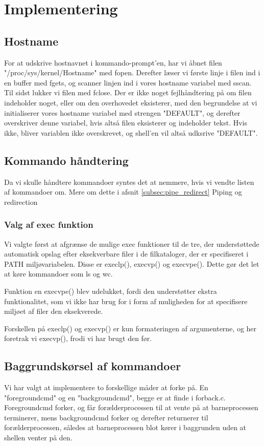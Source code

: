 \section{Implementering}

\subsection{Hostname}
For at udskrive hostnavnet i kommando-prompt'en, har vi åbnet filen "/proc/sys/kernel/Hostname" med fopen. Derefter læser vi første linje i filen ind i en buffer med fgets, og scanner linjen ind i vores hostname variabel med sscan. Til sidst lukker vi filen med fclose. Der er ikke noget fejlhåndtering på om filen indeholder noget, eller om den overhovedet eksisterer, med den begrundelse at vi initialiserer vores hostname variabel med strengen "DEFAULT", og derefter overskriver denne variabel, hvis altså filen eksisterer og indeholder tekst. Hvis ikke, bliver variablen ikke overskrevet, og shell'en vil altså udksrive "DEFAULT".

\subsection{Kommando håndtering}
Da vi skulle håndtere kommandoer syntes det at nemmere, hvis vi vendte listen af kommandoer om. Mere om dette i afsnit \ref{subsec:pipe_redirect} Piping og redirection

\subsubsection{Valg af exec funktion}
Vi valgte først at afgrænse de mulige exec funktioner til de tre, der understøttede automatisk opslag efter eksekverbare filer i de filkataloger, der er specifiseret i PATH miljøvariabelen. Disse er execlp(), execvp() og execvpe(). Dette gør det let at køre kommandoer som ls og wc.

Funktion en execvpe() blev udelukket, fordi den understøtter ekstra funktionalitet, som vi ikke har brug for i form af muligheden for at specifisere miljøet af filer den eksekverede.

Forskellen på execlp() og execvp() er kun formateringen af argumenterne, og her foretrak vi execvp(), frodi vi har brugt den før.

\subsection{Baggrundskørsel af kommandoer}
Vi har valgt at implementere to forskellige måder at forke på. En "foregroundcmd" og en "backgroundcmd", begge er at finde i forback.c. Foregroundcmd forker, og får forælderprocessen til at vente på at barneprocessen terminerer, mens backgroundcmd forker og derefter returnerer til forælderprocessen, således at barneprocessen blot kører i baggrunden uden at shellen venter på den.

